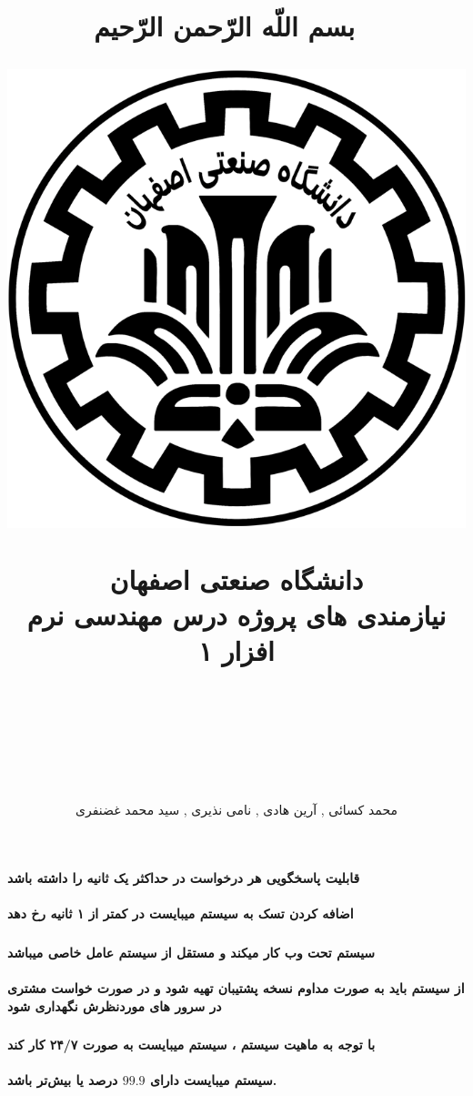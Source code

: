 \documentclass[10pt,a4paper]{article}
\title{
بسم اللّه الرّحمن الرّحیم
~\vspace{0.5cm}
\begin{center}
	\includegraphics[width=0.2\linewidth]{assets/defaults/iut}
\end{center}
~\vspace{0.5cm}
دانشگاه صنعتی اصفهان
~\vspace{1cm}
\\
{
	\huge
نیازمندی های پروژه درس مهندسی نرم افزار ۱
\\~\\
\lr{GDM}
\\
\lr{(Game Development Manager)}
}
~\vspace{1cm}
}
\author{
محمد کسائی
,
آرین هادی
,
نامی نذیری
,
سید محمد غضنفری
}
\begin{document}
 \maketitle
	\part{	}
	\section{}
	\subsection{قابلیت پاسخگویی هر درخواست  در حداکثر یک ثانیه را داشته باشد}
	\subsection{اضافه کردن تسک به سیستم میبایست در کمتر از ۱ ثانیه رخ دهد}
	\section{}
	\subsection{سیستم تحت وب کار میکند و مستقل از سیستم عامل خاصی میباشد}
	\subsection{از سیستم باید به صورت مداوم نسخه پشتیبان تهیه شود و در صورت خواست مشتری در سرور های موردنظرش نگهداری شود}
	\section{}
	\subsection{با توجه به ماهیت سیستم ، سیستم میبایست به صورت ۲۴/۷ کار کند}
	\subsection{
		سیستم میبایست دارای 
		$99.9$
درصد یا بیش‌تر باشد.
	}
	\section{}
\end{document}
